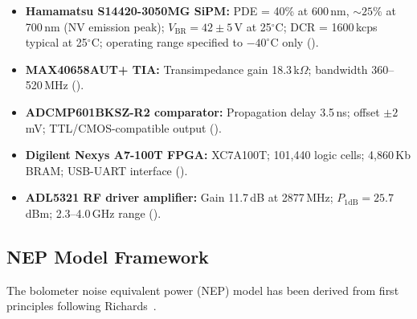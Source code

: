 \begin{itemize}
  \item \textbf{Hamamatsu S14420-3050MG SiPM:} PDE = 40\% at 600\,nm,
    $\sim\!25\%$ at 700\,nm (NV emission peak); %
    $V_{\text{BR}} = 42 \pm 5$\,V at 25$^\circ$C; %
    DCR = 1600\,kcps typical at 25$^\circ$C; %
    operating range specified to $-40^\circ$C only (\cite{S14420datasheet}). %
  \item \textbf{MAX40658AUT+ TIA:} Transimpedance gain 18.3\,k$\Omega$; %
    bandwidth 360--520\,MHz (\cite{MAX40658datasheet}). %
  \item \textbf{ADCMP601BKSZ-R2 comparator:} Propagation delay 3.5\,ns; %
    offset $\pm 2$\,mV; TTL/CMOS-compatible output (\cite{ADCMP601datasheet}).
  \item \textbf{Digilent Nexys A7-100T FPGA:} XC7A100T; 101,440 logic cells; 4,860\,Kb BRAM; %
    USB-UART interface (\cite{NexysA7refmanual}).
  \item \textbf{ADL5321 RF driver amplifier:} Gain 11.7\,dB at 2877\,MHz; %
    $P_{1\text{dB}} = 25.7$\,dBm; 2.3--4.0\,GHz range (\cite{ADL5321datasheet}). %
\end{itemize}

\subsection{NEP Model Framework}
\label{sec:nep_model}

The bolometer noise equivalent power (NEP) model has been derived from first principles
following Richards~\cite{Richards1994}.

